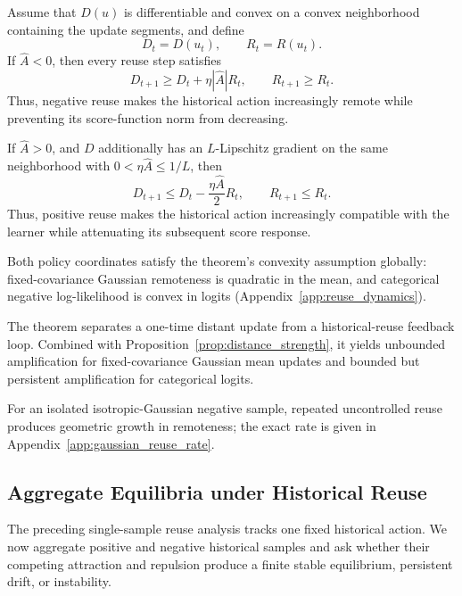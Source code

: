 \documentclass[sigconf,anonymous,review]{acmart}
\theoremstyle{acmdefinition}
\begin{document}
\begin{theorem}
\label{thm:reuse_dynamics}
Assume that \(D(u)\) is differentiable and convex on a convex
neighborhood containing the update segments, and define
\[
    D_t=D(u_t),
    \qquad
    R_t=R(u_t).
\]
If \(\widehat A<0\), then every reuse step satisfies
\begin{equation}
    D_{t+1}
    \ge
    D_t+\eta|\widehat A|R_t,
    \qquad
    R_{t+1}\ge R_t.
    \label{eq:negative_reuse_amplification}
\end{equation}
Thus, negative reuse makes the historical action increasingly remote
while preventing its score-function norm from decreasing.

If \(\widehat A>0\), and \(D\) additionally has an \(L\)-Lipschitz
gradient on the same neighborhood with \(0<\eta\widehat A\le 1/L\), then
\begin{equation}
    D_{t+1}
    \le
    D_t-\frac{\eta\widehat A}{2}R_t,
    \qquad
    R_{t+1}\le R_t.
    \label{eq:positive_reuse_attenuation}
\end{equation}
Thus, positive reuse makes the historical action increasingly compatible
with the learner while attenuating its subsequent score response.
\end{theorem}

Both policy coordinates satisfy the theorem's convexity assumption
globally: fixed-covariance Gaussian remoteness is quadratic in the mean,
and categorical negative log-likelihood is convex in logits
(Appendix~\ref{app:reuse_dynamics}).

The theorem separates a one-time distant update from a historical-reuse
feedback loop. Combined with Proposition~\ref{prop:distance_strength}, it
yields unbounded amplification for fixed-covariance Gaussian mean updates
and bounded but persistent amplification for categorical logits.

For an isolated isotropic-Gaussian negative sample, repeated
uncontrolled reuse produces geometric growth in remoteness; the exact
rate is given in Appendix~\ref{app:gaussian_reuse_rate}.

\subsection{Aggregate Equilibria under Historical Reuse}
\label{sec:aggregate_equilibria}

The preceding single-sample reuse analysis tracks one fixed historical
action. We now aggregate positive and negative historical samples and
ask whether their competing attraction and repulsion produce a finite
stable equilibrium, persistent drift, or instability.
\end{document}
